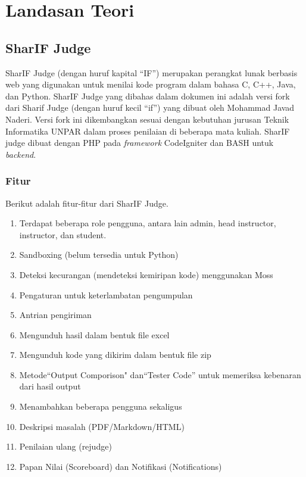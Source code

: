 \chapter{Landasan Teori}
\label{chap:teori}

\section{SharIF Judge}
\label{sec:sharifjudge} 
 
SharIF Judge \cite{SharIF_Judge} (dengan huruf kapital ``IF'') merupakan perangkat lunak berbasis web yang digunakan untuk menilai kode program dalam bahasa C, C++, Java, dan Python. SharIF Judge yang dibahas dalam dokumen ini adalah versi fork dari Sharif Judge \cite{Sharif_Judge_Original} (dengan huruf kecil ``if'') yang dibuat oleh Mohammad Javad Naderi. Versi fork ini dikembangkan sesuai dengan kebutuhan jurusan Teknik Informatika UNPAR dalam proses penilaian di beberapa mata kuliah. SharIF judge dibuat dengan PHP pada \textit{framework} CodeIgniter dan BASH untuk \textit{backend}.

\subsection{Fitur}
\label{subsec:fitur}
Berikut adalah fitur-fitur dari SharIF Judge.
\begin{enumerate}
	\item  Terdapat beberapa role pengguna, antara lain admin, head instructor, instructor, dan student.
	\item  Sandboxing (belum tersedia untuk Python)
	\item Deteksi kecurangan (mendeteksi kemiripan kode) menggunakan Moss
	\item Pengaturan untuk keterlambatan pengumpulan
	\item Antrian pengiriman
	\item Mengunduh hasil dalam bentuk file excel
	\item Mengunduh kode yang dikirim dalam bentuk file zip
	\item Metode``Output Comporison" dan``Tester Code'' untuk memeriksa kebenaran dari hasil output
	\item Menambahkan beberapa pengguna sekaligus
	\item Deskripsi masalah (PDF/Markdown/HTML)
	\item Penilaian ulang (rejudge)
	\item Papan Nilai (Scoreboard) dan Notifikasi (Notifications)
	
\end{enumerate}

